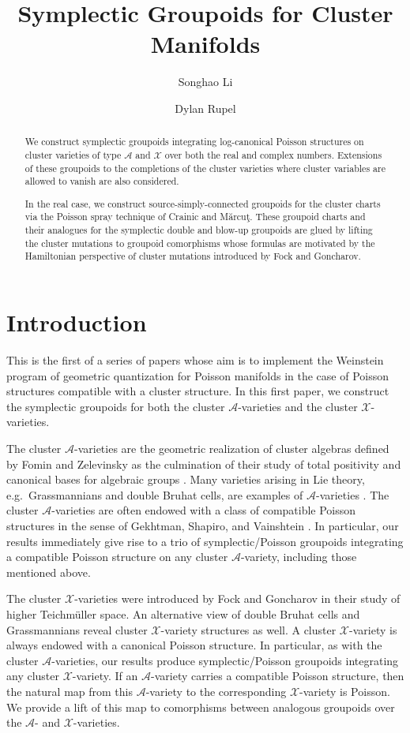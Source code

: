 \documentclass{amsart}
\title{Symplectic Groupoids for Cluster Manifolds}
\author{Songhao Li}
\author{Dylan Rupel}
\numberwithin{equation}{section}
\newcommand{\cA}{\mathcal{A}}
\newcommand{\cX}{\mathcal{X}}
\begin{document}
\begin{abstract}
  We construct symplectic groupoids integrating log-canonical Poisson structures on cluster varieties of type $\cA$ and $\cX$ over both the real and complex numbers.
  Extensions of these groupoids to the completions of the cluster varieties where cluster variables are allowed to vanish are also considered.  

  In the real case, we construct source-simply-connected groupoids for the cluster charts via the Poisson spray technique of Crainic and M\u{a}rcu\c{t}.
  These groupoid charts and their analogues for the symplectic double and blow-up groupoids are glued by lifting the cluster mutations to groupoid comorphisms whose formulas are motivated by the Hamiltonian perspective of cluster mutations introduced by Fock and Goncharov.
\end{abstract}
\maketitle


\section{Introduction}
This is the first of a series of papers whose aim is to implement the Weinstein program of geometric quantization for Poisson manifolds \cite{Wei91} in the case of Poisson structures compatible with a cluster structure.
In this first paper, we construct the symplectic groupoids for both the cluster $\cA$-varieties and the cluster $\cX$-varieties. 

The cluster $\cA$-varieties are the geometric realization of cluster algebras defined by Fomin and Zelevinsky \cite{FZ02} as the culmination of their study of total positivity and canonical bases for algebraic groups \cite{BFZ96,FZ99}.
Many varieties arising in Lie theory, e.g.\ Grassmannians and double Bruhat cells, are examples of $\cA$-varieties \cite{BFZ05,Sco06,GSV03,Wil13b}.
The cluster $\cA$-varieties are often endowed with a class of compatible Poisson structures in the sense of Gekhtman, Shapiro, and Vainshtein \cite{GSV10}.
In particular, our results immediately give rise to a trio of symplectic/Poisson groupoids integrating a compatible Poisson structure on any cluster $\cA$-variety, including those mentioned above. 

The cluster $\cX$-varieties were introduced by Fock and Goncharov \cite{FG09a} in their study of higher Teichm\"uller space.
An alternative view of double Bruhat cells and Grassmannians reveal cluster $\cX$-variety structures as well.
A cluster $\cX$-variety is always endowed with a canonical Poisson structure.
In particular, as with the cluster $\cA$-varieties, our results produce symplectic/Poisson groupoids integrating any cluster $\cX$-variety.
If an $\cA$-variety carries a compatible Poisson structure, then the natural map from this $\cA$-variety to the corresponding $\cX$-variety is Poisson.
We provide a lift of this map to comorphisms between analogous groupoids over the $\cA$- and $\cX$-varieties.
\end{document}
